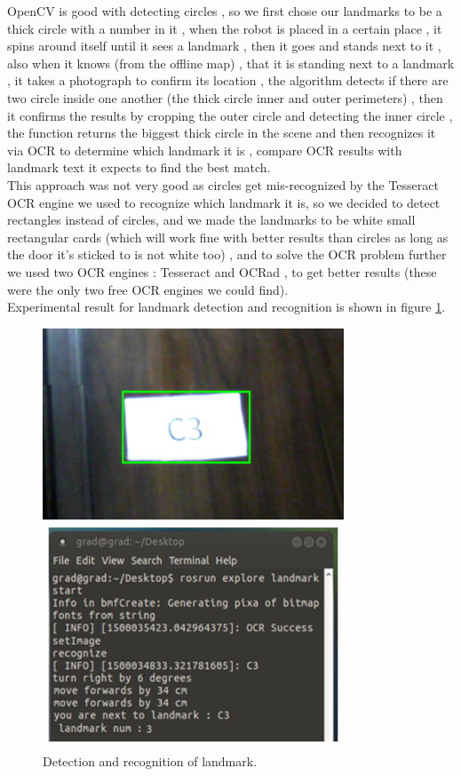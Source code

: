 \documentclass[12pt]{book}
\begin{document}
\noindent OpenCV is good with detecting circles , so we first chose our landmarks to be a thick circle with a number in it , when the robot is placed in a certain place , it spins around itself until it sees a landmark , then it goes and stands next to it , also when it knows (from the offline map) ,  that it is standing next to a landmark ,  it takes a photograph to confirm its location , the algorithm detects if there are two circle inside one another (the thick circle inner and outer perimeters) , then it confirms the results by cropping the outer circle and detecting the inner circle , the function returns the biggest thick circle in the scene and then recognizes it via OCR to determine which landmark it is , compare OCR results with landmark text it expects to find the best match.\\

\noindent This approach was not very good as circles get mis-recognized by the
Tesseract OCR engine we used to recognize which landmark it is, so we decided to detect rectangles instead of circles, and we made the landmarks to be white small rectangular cards (which will work fine with better results than circles as long as the door it’s sticked to is not white too) , and to solve the OCR problem further we used two OCR engines : Tesseract and OCRad , to get better results (these were the only two free OCR engines we could find).\\

\noindent Experimental result for landmark detection and recognition is shown in figure \ref{fig:landmark-result}.

\begin{figure}
	\centering
	\includegraphics[width =0.8\textwidth]{Fig/landmark-result.png}
	\caption{Detection and recognition of landmark.}
	\label{fig:landmark-result}
\end{figure}
\end{document}
